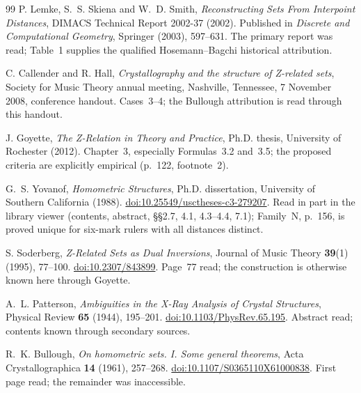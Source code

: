 \documentclass[11pt]{article}
\theoremstyle{remark}
\begin{document}
\begin{thebibliography}{99}
P. Lemke, S.~S. Skiena and W.~D. Smith,
\emph{Reconstructing Sets From Interpoint Distances},
DIMACS Technical Report 2002-37 (2002).
Published in \emph{Discrete and Computational Geometry},
Springer (2003), 597--631.
The primary report was read; Table~1 supplies the qualified
Hosemann--Bagchi historical attribution.

C. Callender and R. Hall,
\emph{Crystallography and the structure of Z-related sets},
Society for Music Theory annual meeting, Nashville, Tennessee,
7 November 2008, conference handout.
Cases~3--4; the Bullough attribution is read through this handout.

J. Goyette,
\emph{The Z-Relation in Theory and Practice},
Ph.D. thesis, University of Rochester (2012).
Chapter~3, especially Formulas~3.2 and~3.5; the proposed criteria
are explicitly empirical (p.~122, footnote~2).

G.~S. Yovanof, \emph{Homometric Structures}, Ph.D. dissertation,
University of Southern California (1988).
\href{https://doi.org/10.25549/usctheses-c3-279207}{doi:10.25549/usctheses-c3-279207}.
Read in part in the library viewer (contents, abstract, \S\S2.7, 4.1, 4.3--4.4, 7.1);
Family~N, p.~156, is proved unique for six-mark rulers with all distances distinct.

S. Soderberg, \emph{Z-Related Sets as Dual Inversions}, Journal of Music
Theory \textbf{39}(1) (1995), 77--100.
\href{https://doi.org/10.2307/843899}{doi:10.2307/843899}.
Page~77 read; the construction is otherwise known here through Goyette.

A.~L. Patterson, \emph{Ambiguities in the X-Ray Analysis of Crystal
Structures}, Physical Review \textbf{65} (1944), 195--201.
\href{https://doi.org/10.1103/PhysRev.65.195}{doi:10.1103/PhysRev.65.195}.
Abstract read; contents known through secondary sources.

R.~K. Bullough, \emph{On homometric sets. I. Some general theorems},
Acta Crystallographica \textbf{14} (1961), 257--268.
\href{https://doi.org/10.1107/S0365110X61000838}{doi:10.1107/S0365110X61000838}.
First page read; the remainder was inaccessible.

\end{thebibliography}
\end{document}
